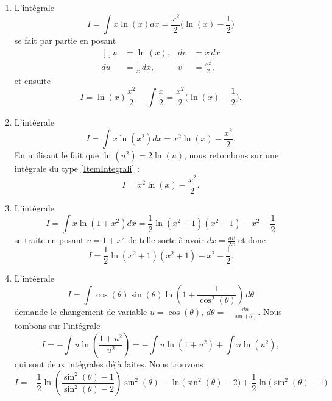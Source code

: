 \begin{enumerate}
	\item	\label{ItemIntegrali}
		L'intégrale
		\begin{equation}
			\boxed{I=\int x\ln(x)dx=\frac{ x^2 }{2}\big( \ln(x)-\frac{ 1 }{2} \big)}
		\end{equation}
		se fait par partie en posant
		\begin{equation}
			\begin{aligned}[]
				u&=\ln(x),		& dv&=x\,dx\\
				du&=\frac{1}{ x }\,dx,	& v&=\frac{ x^2 }{2},
			\end{aligned}
		\end{equation}
		et ensuite
		\begin{equation}
			I=\ln(x)\frac{ x^2 }{2}-\int\frac{ x }{2}=\frac{ x^2 }{2}\big( \ln(x)-\frac{ 1 }{2} \big).
		\end{equation}
		
	\item	
		L'intégrale
		\begin{equation}
			\boxed{I=\int x\ln(x^2)dx=x^2\ln(x)-\frac{ x^2 }{2}.}
		\end{equation}
		En utilisant le fait que $\ln(u^2)=2\ln(u)$, nous retombons sur une intégrale du type \ref{ItemIntegrali} :
		\begin{equation}
			I=x^2\ln(x)-\frac{ x^2 }{2}.
		\end{equation}
	\item
		L'intégrale
		\begin{equation}		\label{EqTrucIntxlnxsqpun}
			\boxed{I=\int x\ln(1+x^2)dx=\frac{ 1 }{2}\ln(x^2+1)(x^2+1)-x^2-\frac{ 1 }{2}}
		\end{equation}
		se traite en posant $v=1+x^2$ de telle sorte à avoir $dx=\frac{ dv }{ 2x }$ et donc
		\begin{equation}
			I=\frac{ 1 }{2}\ln(x^2+1)(x^2+1)-x^2-\frac{ 1 }{2}.
		\end{equation}
		
	\item
		L'intégrale
		\begin{equation}
			I=\int \cos(\theta)\sin(\theta)\ln\left( 1+\frac{1}{ \cos^2(\theta) } \right)\,d\theta
		\end{equation}
		demande le changement de variable $u=\cos(\theta)$, $d\theta=-\frac{ du }{ \sin(\theta) }$. Nous tombons sur l'intégrale
		\begin{equation}
			I=-\int u\ln\left( \frac{ 1+u^2 }{ u^2 } \right)=-\int u\ln(1+u^2)+\int u\ln(u^2),
		\end{equation}
		qui sont deux intégrales déjà faites. Nous trouvons
		\begin{equation}
			I=-\frac{ 1 }{2}\ln\left( \frac{ \sin^2(\theta)-1 }{ \sin^2(\theta)-2 } \right)\sin^2(\theta)-\ln\big( \sin^2(\theta)-2 \big)+\frac{ 1 }{2}\ln\big( \sin^2(\theta)-1 \big)
		\end{equation}
	

\end{enumerate}
